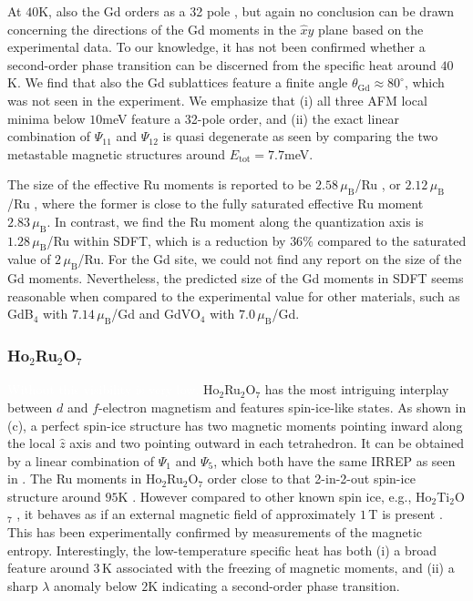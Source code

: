 \documentclass[10pt]{iopart}
\newcommand{\mub}{\,\mu_\text{B}}
\newcommand{\white}[1]{\textcolor{white}{#1}}
\begin{document}
At $40$K, also the Gd orders as a 32 pole \cite{gurgul2007bulk}, but again no conclusion can be drawn concerning the directions of the Gd moments in the $\hat{x}\hat{y}$ plane based on the experimental data. To our knowledge, it has not been confirmed whether a second-order phase transition can be discerned from the specific heat \cite{taira2002magnetic} around $40$K. 
We find that also the Gd sublattices feature a finite angle $\theta_{\mathrm{Gd}}\approx 80^{\circ}$, which was not seen in the experiment. We emphasize that (i) all three AFM local minima below $10$meV feature a 32-pole order, and (ii) the exact linear combination of $\Psi_{11}$ and $\Psi_{12}$ is quasi degenerate as seen by comparing the two metastable magnetic structures around $E_{\mathrm{tot}} = 7.7$meV.

The size of the effective Ru moments is reported to be $2.58 \mub$/Ru \cite{taira2002magnetic}, or $2.12 \mub$/Ru \cite{yao2011hydrothermal}, where the former is close to the fully saturated effective Ru moment $2.83\mub$. In contrast, we find the Ru moment along the quantization axis is $1.28\mub$/Ru within SDFT, which is a reduction by $36\%$ compared to the saturated value of $2\mub$/Ru.
For the Gd site, we could not find any report on the size of the Gd moments. Nevertheless, the predicted size of the Gd moments in SDFT seems reasonable when compared to the experimental value for other materials, such as GdB$_4$ with $7.14\mub$/Gd \cite{Blanco2006} and GdVO$_4$ \cite{Palacios2018} with $7.0\mub$/Gd.


\subsubsection{\texorpdfstring{Ho$_2$Ru$_2$O$_7$}{Ho2Ru2O7}} \white{Without this visibility is very low.}
\newline
Ho$_2$Ru$_2$O$_7$ has the most intriguing interplay between $d$ and $f$-electron magnetism and features spin-ice-like states. 
As shown in  (c), a perfect spin-ice structure has two magnetic moments pointing inward along the local $\hat{z}$ axis and two pointing outward in each tetrahedron. It can be obtained by a linear combination of $\Psi_1$ and $\Psi_5$, which both have the same IRREP as seen in . The Ru moments in Ho$_2$Ru$_2$O$_7$ order close to that 2-in-2-out spin-ice structure around $95$K \cite{wiebe2004magnetic,gardner2005spin}. However compared to other known spin ice, e.g., Ho$_2$Ti$_2$O$_7$ \cite{bramwell2001science}, it behaves as if an external magnetic field of approximately $1\,$T is present \cite{gardner2005spin}. This has been experimentally confirmed by measurements of the magnetic entropy. Interestingly, the low-temperature specific heat \cite{gardner2005spin} has both (i) a broad feature around $3\,$K associated with the freezing of magnetic moments, and (ii) a sharp $\lambda$ anomaly below $2$K indicating a second-order phase transition.
\end{document}

